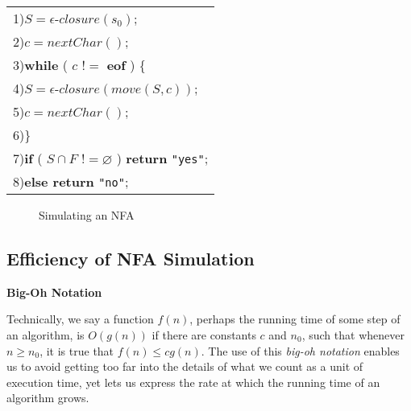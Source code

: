 \documentclass[12pt,a4paper,twoside,openany]{book}
\begin{document}

\begin{center}
    \begin{tabular}{l}
        1)\quad$S=\epsilon$-$closure(s_0)$;\\
        2)\quad$c=nextChar()$;\\
        3)\quad\textbf{while} ( $c$ !$=$ \textbf{eof} ) \{\\
        4)\quad\qquad$S=\epsilon$-$closure(move(S,c))$;\\
        5)\quad\qquad$c=nextChar()$;\\
        6)\quad\}\\
        7)\quad\textbf{if} ( $S\cap F$ !$=\varnothing$ ) \textbf{return} \verb|"yes"|;\\
        8)\quad\textbf{else return} \verb|"no"|;
    \end{tabular}
\end{center}
\begin{figure}[htbp]
    \caption{Simulating an NFA}
    \label{Figure:3.37}
\end{figure}

\subsection{Efficiency of NFA Simulation}

\begin{framed}
    \begin{center}
        \textbf{{\large Big-Oh Notation}}
    \end{center}

    Technically, we say a function $f(n)$, perhaps the running time of some step of an algorithm, is $O(g(n))$  if there are constants $c$ and $n_0$, such that whenever $n\ge n_0$, it is true that $f(n)\le cg(n)$. The use of this \textit{big-oh notation} enables us to avoid getting too far into the details of what we count as a unit of execution time, yet lets us express the rate at which the running time of an algorithm grows.
\end{framed}
\end{document}
